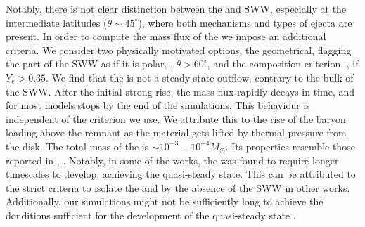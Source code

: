 Notably, there is not clear distinction between the \nwind{} and \ac{SWW}, especially 
at the intermediate latitudes ($\theta \sim 45^{\circ}$), where both mechanisms and 
types of ejecta are present.
%
In order to compute the mass flux of the \nwind{} we impose an additional criteria.
We consider two physically motivated options, the geometrical, flagging the part of the \ac{SWW} 
as \nwind{} if it is polar, \ie, $\theta>60^{\circ}$, and the composition criterion,
                                  \ie, if $Y_e > 0.35$.
%
We find that the \nwind{} is not a steady state outflow, contrary to the bulk of the \ac{SWW}.
After the initial strong rise, the mass flux rapidly decays in time, and for most models stops 
by the end of the simulations. This behaviour is independent of the criterion we use. 
We attribute this to the rise of the baryon loading above the remnant as the material gets lifted 
by thermal pressure from the disk.
The total mass of the \nwind{} is ${\sim}10^{-3}-10^{-4}M_{\odot}$. Its properties resemble those 
reported in \eg, \citet{Dessart:2008zd,Perego:2014fma,Fujibayashi:2020dvr}.
Notably, in some of the works, the \nwind{} was found to require longer timescales to develop, 
achieving the quasi-steady state. 
This can be attributed to the strict criteria to isolate the \nwind{} and by the absence of the 
\ac{SWW} in other works. 
Additionally, our simulations might not be sufficiently long to achieve the donditions 
sufficient for the development of the quasi-steady state \nwind{}.













